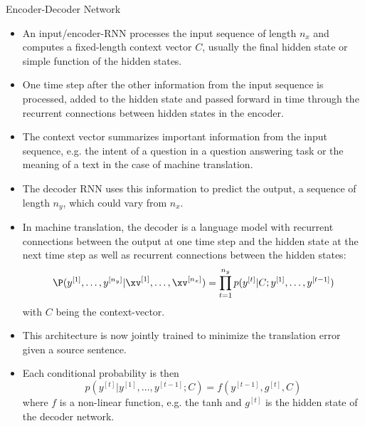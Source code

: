 \begin{vbframe}{Encoder-Decoder Network}
\begin{itemize}
    \item An input/encoder-RNN processes the input sequence of length $n_x$ and computes a fixed-length context vector $C$, usually the final hidden state or  simple function of the hidden states.
    \item One time step after the other information from the input sequence is processed, added to the hidden state and passed forward in time through the recurrent connections between hidden states in the encoder.
    \item  The context vector summarizes important information from the input sequence, e.g. the intent of a question in a question answering task or the meaning of a text in the case of machine translation.
    \item The decoder RNN uses this information to predict the output, a sequence of length $n_y$, which could vary from $n_x$. 
    \item In machine translation, the decoder is a language model with recurrent connections between the output at one time step and the hidden state at the next time step as well as recurrent connections between the hidden states:
    $$\P(y^{[1]}, \dots, y^{[n_y]}|\xv^{[1]}, \dots, \xv^{[n_x]}) = \displaystyle \prod_{t=1}^{n_y} p(y^{[t]}|C; y^{[1]}, \dots, y^{[t-1]})$$ with $C$ being the context-vector.
    \item This architecture is now jointly trained to minimize the translation
error given a source sentence.
    \item Each conditional probability is then $$p(y^{[t]}|y^{[1]}, \dots, y^{[t-1]};C) = f(y^{[t-1]}, g^{[t]}, C)$$ where $f$ is a non-linear function, e.g. the tanh and $g^{[t]}$ is the hidden state of the decoder network.
  \end{itemize}
\end{vbframe}





